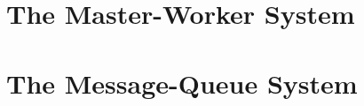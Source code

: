 

\section{The Master-Worker System}\label{sec:mw}


\section{The Message-Queue System}\label{sec:mq}

